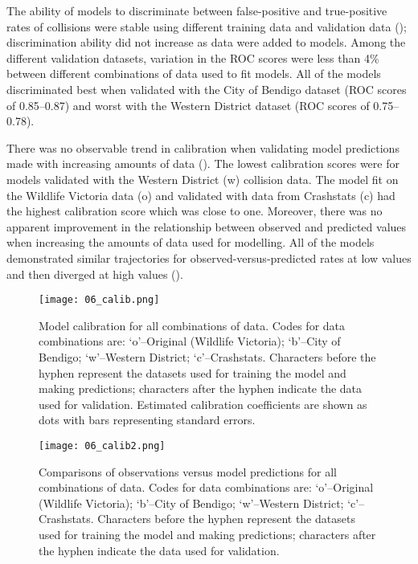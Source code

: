 The ability of models to discriminate between false-positive and true-positive rates of collisions were stable using different training data and validation data (); discrimination ability did not increase as data were added to models. Among the different validation datasets, variation in the ROC scores were less than 4\% between different combinations of data used to fit models. All of the models discriminated best when validated with the City of Bendigo dataset (ROC scores of 0.85--0.87) and worst with the Western District dataset (ROC scores of 0.75--0.78). 

There was no observable trend in calibration when validating model predictions made with increasing amounts of data (). The lowest calibration scores were for models validated with the Western District (w) collision data. The model fit on the Wildlife Victoria data (o) and validated with data from Crashstats (c) had the highest calibration score which was close to one. Moreover, there was no apparent improvement in the relationship between observed and predicted values when increasing the amounts of data used for modelling. All of the models demonstrated similar trajectories for observed-versus-predicted rates at low values and then diverged at high values ().

\begin{figure*}[!h]
  \centering
  \texttt{[image: 06\_calib.png]}
  \caption[Model calibration for all combinations of original and independent data]{Model calibration for all combinations of data. Codes for data combinations are: `o'--Original (Wildlife Victoria); `b'--City of Bendigo; `w'--Western District; `c'--Crashstats. Characters before the hyphen represent the datasets used for training the model and making predictions; characters after the hyphen indicate the data used for validation. Estimated calibration coefficients are shown as dots with bars representing standard errors.}
  \label{val_calib}
\end{figure*}

\begin{figure*}[!t]
  \centering
  \texttt{[image: 06\_calib2.png]}
  \caption[Comparisons of observations versus model predictions for all combinations of original and independent data]{Comparisons of observations versus model predictions for all combinations of data. Codes for data combinations are: `o'--Original (Wildlife Victoria); `b'--City of Bendigo; `w'--Western District; `c'--Crashstats. Characters before the hyphen represent the datasets used for training the model and making predictions; characters after the hyphen indicate the data used for validation.}
  \label{val_calib2}
\end{figure*}


